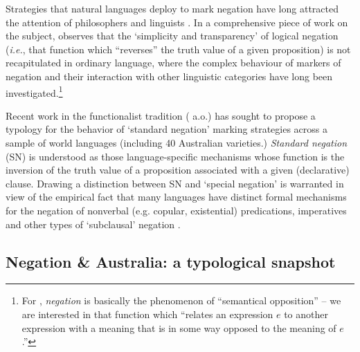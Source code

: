  Strategies that natural languages deploy to mark negation have long attracted the attention of philosophers and linguists \citep[see][]{Horn1989,Horn2010}. In a comprehensive piece of work on the subject, \citet[xiii-xiv]{Horn1989} observes that the ‘simplicity and transparency’ of logical negation (\textit{i.e.}, that function which ``reverses'' the truth value of a given proposition) is not recapitulated in ordinary language, where the complex behaviour of markers of negation and their interaction with other linguistic categories have long been investigated.\footnote{For \citet[1]{Horn2017}, \textit{negation} is basically the phenomenon of ``semantical opposition'' -- we are interested in that function which ``relates an expression $ e $ to another expression with a meaning that is in some way opposed to the meaning of $ e $.''}


 Recent work in the functionalist tradition (\citealt[\textit{e.g.},][]{Miestamo2005} a.o.) has sought to propose a typology for the behavior of `standard negation' marking strategies across a sample of world languages (including 40 Australian varieties.) \textit{Standard negation} (SN) is understood as those language-specific mechanisms whose function is the inversion of the truth value of a proposition associated with a given (declarative) clause. Drawing a distinction between SN and `special negation' is warranted in view of the empirical fact that many languages have distinct formal mechanisms for the negation of nonverbal (e.g. copular, existential) predications, imperatives and other types of `subclausal' negation \citep{Miestamo2007,Horn2017,Veselinova2013,VanderAuwera2005}.
\subsection{Negation \& Australia: a typological snapshot}

